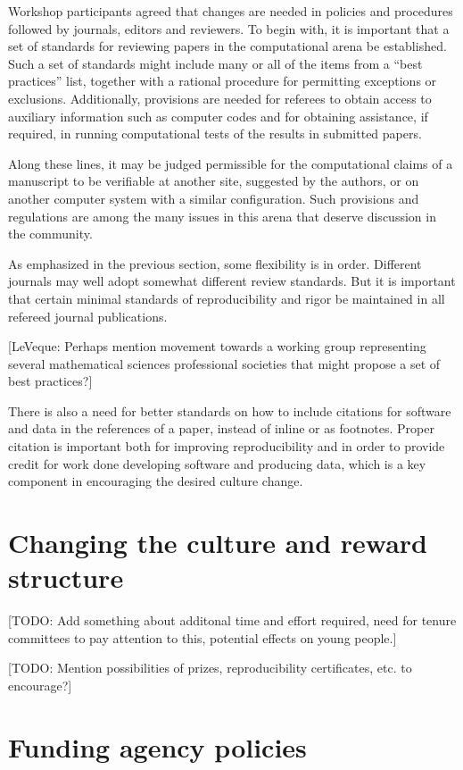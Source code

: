 \documentclass[11pt]{article}
\newcommand{\todo}[1]{{\color{red} [TODO: #1]}}
\newcommand{\comment}[1]{{\color{blue} [#1]}}
\newcommand{\todo}[1]{}
\newcommand{\comment}[1]{}
\begin{document}
Workshop participants agreed that changes are needed in policies and
procedures followed by journals, editors and reviewers.
To begin with, it is important that a set of standards for reviewing papers
in the computational arena be established.  Such a set of standards might
include many or all of the items from a ``best practices'' list, 
together with a rational
procedure for permitting exceptions or exclusions.  Additionally, provisions
are needed for referees to obtain access to auxiliary information such as
computer codes and for obtaining assistance, if required, in running
computational tests of the results in submitted papers.

Along these lines, it may be judged permissible for  the computational
claims of a  manuscript
to be verifiable at another site, suggested by the
authors, or on another computer system with a similar configuration.  Such
provisions and regulations are among the many issues in this arena that
deserve discussion in the community.

As emphasized in the previous section, some flexibility is in order. 
Different journals may well adopt somewhat different review standards.
But it is important that certain minimal standards of reproducibility and
rigor be maintained in all refereed journal publications.

\comment{LeVeque: Perhaps mention movement towards a working group
representing several mathematical sciences professional societies
that might propose a set of best practices?}

There is also a need for better standards on how to 
include citations for software and data in the
references of a paper, instead of inline or as footnotes.
Proper citation is important both for improving reproducibility and in order
to provide credit for work done developing software and producing data,
which is a key component in encouraging the desired culture change.

\section{Changing the culture and reward structure} \label{sec:rewards}

\todo{Add something about additonal time and effort required, 
need for tenure committees to pay
attention to this, potential effects on young people.}

\todo{Mention possibilities of prizes, reproducibility certificates, etc. to
encourage?}

\section{Funding agency policies} \label{sec:funding}
\end{document}
